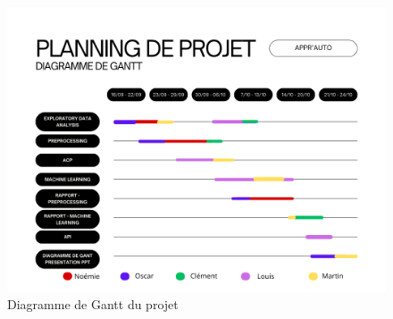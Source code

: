 \documentclass{article}
\begin{document}
\newpage


\begin{figure}[H]
    \centering
    \includegraphics[width=\textwidth, height=0.35\textheight]{images/Diagramme_Gantt.png}
    \caption{Diagramme de Gantt du projet}
    \label{fig:gantt}
\end{figure}
\end{document}
